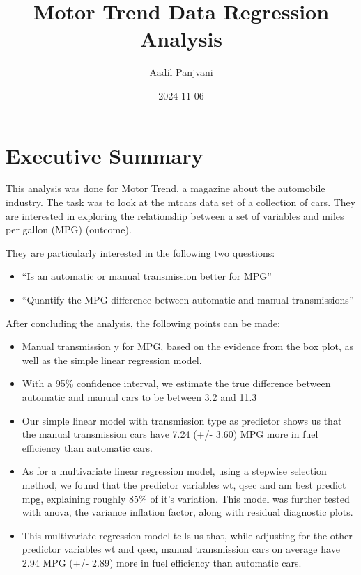 \documentclass[
]{article}
\title{Motor Trend Data Regression Analysis}
\author{Aadil Panjvani}
\date{2024-11-06}
\providecommand{\tightlist}{%
  \setlength{\itemsep}{0pt}\setlength{\parskip}{0pt}}
\begin{document}
\maketitle

\section{Executive Summary}\label{executive-summary}

This analysis was done for Motor Trend, a magazine about the automobile
industry. The task was to look at the mtcars data set of a collection of
cars. They are interested in exploring the relationship between a set of
variables and miles per gallon (MPG) (outcome).

They are particularly interested in the following two questions:

\begin{itemize}
\tightlist
\item
  ``Is an automatic or manual transmission better for MPG''
\item
  ``Quantify the MPG difference between automatic and manual
  transmissions''
\end{itemize}

After concluding the analysis, the following points can be made:

\begin{itemize}
\tightlist
\item
  Manual transmission y for MPG, based on the evidence from the box
  plot, as well as the simple linear regression model.
\item
  With a 95\% confidence interval, we estimate the true difference
  between automatic and manual cars to be between 3.2 and 11.3
\item
  Our simple linear model with transmission type as predictor shows us
  that the manual transmission cars have 7.24 (+/- 3.60) MPG more in
  fuel efficiency than automatic cars.
\item
  As for a multivariate linear regression model, using a stepwise
  selection method, we found that the predictor variables wt, qsec and
  am best predict mpg, explaining roughly 85\% of it's variation. This
  model was further tested with anova, the variance inflation factor,
  along with residual diagnostic plots.
\item
  This multivariate regression model tells us that, while adjusting for
  the other predictor variables wt and qsec, manual transmission cars on
  average have 2.94 MPG (+/- 2.89) more in fuel efficiency than
  automatic cars.
\end{itemize}
\end{document}
